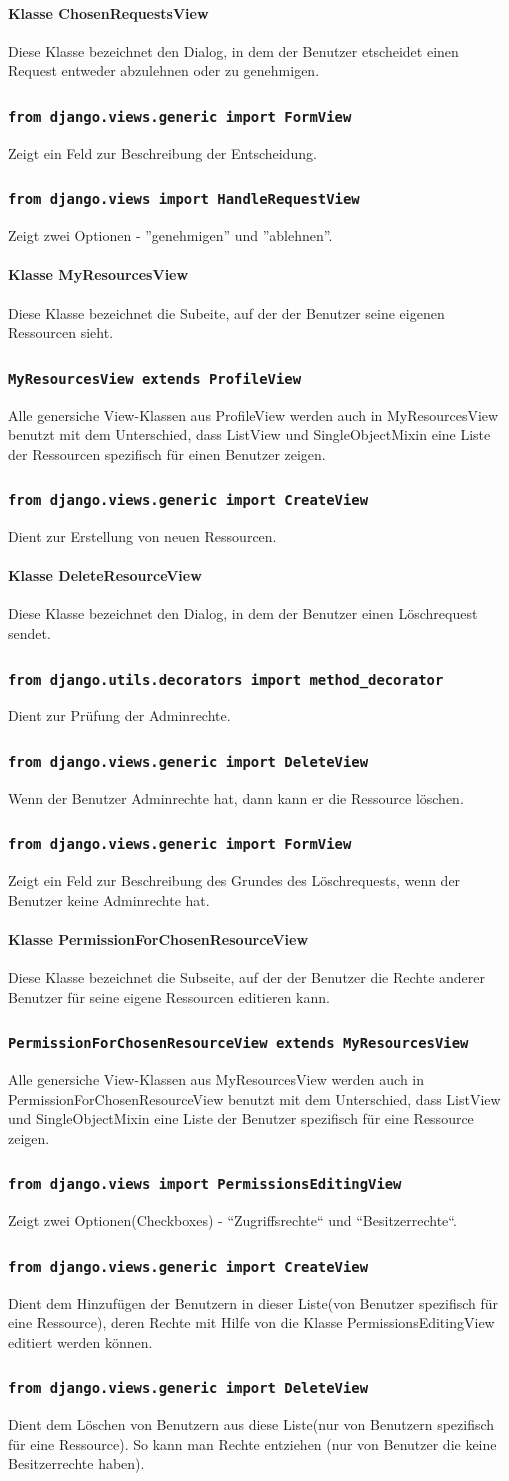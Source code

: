 \documentclass[parskip=full,11pt]{scrartcl}
\newcommand{\class}[1]{\subsubsection*{\lstinline[basicstyle=\ttfamily\large]{#1}}}
\begin{document}
\paragraph*{Klasse ChosenRequestsView}
 Diese Klasse bezeichnet den Dialog, in dem der Benutzer etscheidet einen Request entweder abzulehnen oder zu genehmigen. 
\class{from django.views.generic import FormView} 
 Zeigt ein Feld zur Beschreibung der Entscheidung.
\class{from django.views import HandleRequestView}
 Zeigt zwei Optionen - ''genehmigen'' und ''ablehnen''.
 
\paragraph*{Klasse MyResourcesView}
 Diese Klasse bezeichnet die Subeite, auf der der Benutzer seine eigenen Ressourcen sieht.
\class{MyResourcesView extends ProfileView}
 Alle genersiche View-Klassen aus ProfileView werden auch in MyResourcesView benutzt mit dem Unterschied, dass ListView und SingleObjectMixin eine Liste der Ressourcen spezifisch für einen Benutzer zeigen.
\class{from django.views.generic import CreateView}
Dient zur Erstellung von neuen Ressourcen.

\paragraph*{Klasse DeleteResourceView}
 Diese Klasse bezeichnet den Dialog, in dem der Benutzer einen Löschrequest sendet.
 \class{from django.utils.decorators import method_decorator}
 Dient zur Prüfung der Adminrechte. 
 \class{from django.views.generic import DeleteView}
 Wenn der Benutzer Adminrechte hat, dann kann er die Ressource löschen.
 \class{from django.views.generic import FormView}
 Zeigt ein Feld zur Beschreibung des Grundes des Löschrequests, wenn der Benutzer keine Adminrechte hat.
 
\paragraph*{Klasse PermissionForChosenResourceView}
 Diese Klasse bezeichnet die Subseite, auf der der Benutzer die Rechte anderer Benutzer für seine eigene Ressourcen editieren kann.
\class{PermissionForChosenResourceView extends MyResourcesView}
 Alle genersiche View-Klassen aus MyResourcesView werden auch in PermissionForChosenResourceView benutzt mit dem Unterschied, dass ListView und SingleObjectMixin eine Liste der Benutzer spezifisch für eine Ressource zeigen.
\class{from django.views import PermissionsEditingView}
Zeigt zwei Optionen(Checkboxes) - ``Zugriffsrechte`` und ``Besitzerrechte``.
\class{from django.views.generic import CreateView}
Dient dem Hinzufügen der Benutzern in dieser Liste(von Benutzer spezifisch für eine Ressource), deren Rechte mit Hilfe von die Klasse PermissionsEditingView editiert werden können.
\class{from django.views.generic import DeleteView}
Dient dem Löschen von Benutzern aus diese Liste(nur von Benutzern spezifisch für eine Ressource). So kann man Rechte entziehen (nur  von Benutzer die keine Besitzerrechte haben).
\end{document}
